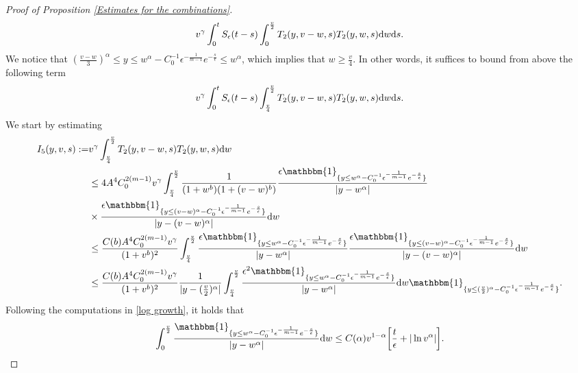 \documentclass[11pt]{article}
\numberwithin{equation}{section}
\newcommand{\der}{\textup{d}}
\begin{document}
\begin{proof}[Proof of Proposition \ref{Estimates for the combinations}]
\begin{align}
    v^{\gamma}\int_{0}^{t}S_{\epsilon}(t-s)\int_{0}^{\frac{v}{2}} T_{2}(y,v-w,s)T_{2}(y,w,s)\der w\der s.
\end{align}
We notice that $(\frac{v-w}{3})^{\alpha}\leq y\leq  w^{\alpha}-C_{0}^{-1}\epsilon^{-\frac{1}{m-1}}e^{-\frac{s}{\epsilon}}\leq w^{\alpha}$, which implies that $w\geq \frac{v}{4}$. In other words, it suffices to bound from above the following term
\begin{align}\label{semigroup t2 t2}
    v^{\gamma}\int_{0}^{t}S_{\epsilon}(t-s)\int_{\frac{v}{4}}^{\frac{v}{2}} T_{2}(y,v-w,s)T_{2}(y,w,s)\der w\der s.
\end{align}
We start by estimating
\begin{align*}
   I_{5}(y,v,s):=& v^{\gamma}\int_{\frac{v}{4}}^{\frac{v}{2}} T_{2}(y,v-w,s)T_{2}(y,w,s)\der w\\
    &   \leq 4A^{4}C_{0}^{2(m-1)}v^{\gamma}\int_{\frac{v}{4}}^{\frac{v}{2}}\frac{1}{(1+w^{b})(1+(v-w)^{b})}\frac{\epsilon\mathbbm{1}_{\{y\leq w^{\alpha}-C_{0}^{-1}\epsilon^{-\frac{1}{m-1}}e^{-\frac{s}{\epsilon}}\}}}{|y-w^{\alpha}|}\\
    &\times\frac{\epsilon\mathbbm{1}_{\{y\leq (v-w)^{\alpha}-C_{0}^{-1}\epsilon^{-\frac{1}{m-1}}e^{-\frac{s}{\epsilon}}\}}}{|y-(v-w)^{\alpha}|}\der w\\
& \leq  \frac{C(b)A^{4}C_{0}^{2(m-1)}v^{\gamma}}{(1+v^{b})^{2}}\int_{\frac{v}{4}}^{\frac{v}{2}}\frac{\epsilon\mathbbm{1}_{\{y\leq w^{\alpha}-C_{0}^{-1}\epsilon^{-\frac{1}{m-1}}e^{-\frac{s}{\epsilon}}\}}}{|y-w^{\alpha}|}\frac{\epsilon\mathbbm{1}_{\{y\leq (v-w)^{\alpha}-C_{0}^{-1}\epsilon^{-\frac{1}{m-1}}e^{-\frac{s}{\epsilon}}\}}}{|y-(v-w)^{\alpha}|}\der w\\
& \leq  \frac{C(b)A^{4}C_{0}^{2(m-1)}v^{\gamma}}{(1+v^{b})^{2}}\frac{1}{|y-(\frac{v}{2})^{\alpha}|}\int_{\frac{v}{4}}^{\frac{v}{2}}\frac{\epsilon^{2}\mathbbm{1}_{\{y\leq w^{\alpha}-C_{0}^{-1}\epsilon^{-\frac{1}{m-1}}e^{-\frac{s}{\epsilon}}\}}}{|y-w^{\alpha}|}\der w\mathbbm{1}_{\{y\leq (\frac{v}{2})^{\alpha}-C_{0}^{-1}\epsilon^{-\frac{1}{m-1}}e^{-\frac{s}{\epsilon}}\}}.
\end{align*}
Following the computations in \eqref{log growth}, it holds that
\begin{align}\label{y-w integral}
\int_{0}^{\frac{v}{2}}\frac{\mathbbm{1}_{\{y\leq w^{\alpha}-C_{0}^{-1}\epsilon^{-\frac{1}{m-1}}e^{-\frac{s}{\epsilon}}\}}}{|y-w^{\alpha}|}\der w\leq C(\alpha)v^{1-\alpha}\bigg[\frac{t}{\epsilon}+|\ln{v^{\alpha}}|\bigg].
\end{align}

\end{proof}
\end{document}
